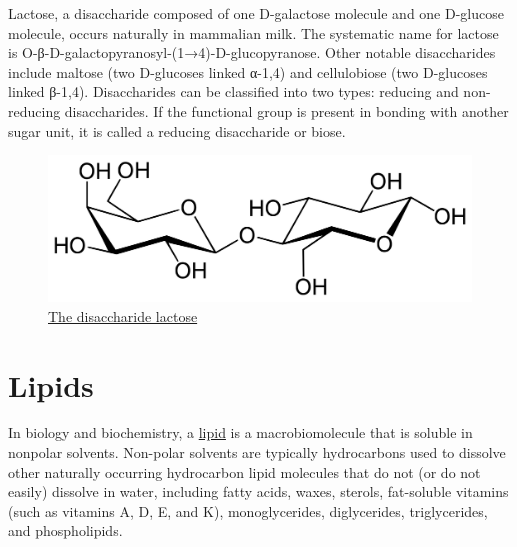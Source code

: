 Lactose, a disaccharide composed of one D-galactose molecule and one D-glucose molecule, occurs naturally in mammalian milk. The systematic name for lactose is O-β-D-galactopyranosyl-(1→4)-D-glucopyranose. Other notable disaccharides include maltose (two D-glucoses linked α-1,4) and cellulobiose (two D-glucoses linked β-1,4). Disaccharides can be classified into two types: reducing and non-reducing disaccharides. If the functional group is present in bonding with another sugar unit, it is called a reducing disaccharide or biose.



\begin{figure}

{\centering \includegraphics[width=0.7\linewidth]{./figures/chemistry/Beta-D-Lactose} 

}

\caption{\href{https://commons.wikimedia.org/wiki/File:Beta-D-Lactose.svg}{The disaccharide lactose}}\label{fig:lactosestruc}
\end{figure}

\hypertarget{lipids}{%
\section{Lipids}\label{lipids}}

In biology and biochemistry, a \href{https://en.wikipedia.org/wiki/Lipid}{lipid} is a macrobiomolecule that is soluble in nonpolar solvents. Non-polar solvents are typically hydrocarbons used to dissolve other naturally occurring hydrocarbon lipid molecules that do not (or do not easily) dissolve in water, including fatty acids, waxes, sterols, fat-soluble vitamins (such as vitamins A, D, E, and K), monoglycerides, diglycerides, triglycerides, and phospholipids.



